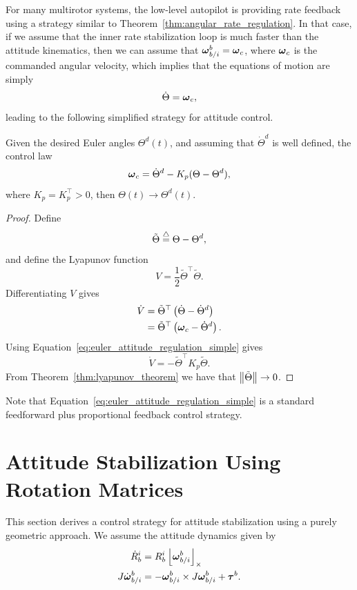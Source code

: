 For many multirotor systems, the low-level autopilot is providing rate feedback using a strategy similar to Theorem~\ref{thm:angular_rate_regulation}.  In that case, if we assume that the inner rate stabilization loop is much faster than the attitude kinematics, then we can assume that $\boldsymbol{\omega}_{b/i}^b = \boldsymbol{\omega}_c$, where $\boldsymbol{\omega}_c$ is the commanded angular velocity, which implies that the equations of motion are simply
\[
\dot{\Theta} = \boldsymbol{\omega}_c,
\]
leading to the following simplified strategy for attitude control.
\begin{theorem}\label{thm:euler_attitude_stabilization_simple}
	Given the desired Euler angles $\Theta^d(t)$, and assuming that $\dot{\Theta}^d$ is well defined, the control law
	\begin{equation}\label{eq:euler_attitude_regulation_simple}
	\omegabf_c = \dot{\Theta}^d - K_p (\Theta-\Theta^d),
	\end{equation}
	where $K_p=K_p^\top >0$, then $\Theta(t)\to\Theta^d(t)$.
\end{theorem}
\begin{proof}
Define
\[
\tilde{\Theta} \stackrel{\triangle}{=} \Theta - \Theta^d,
\]
and define the Lyapunov function
\[
V = \frac{1}{2}\tilde{\Theta}^\top \tilde{\Theta}.
\]
Differentiating $V$ gives
\begin{align*}
\dot{V} &= \tilde{\Theta}^\top \left(\dot{\Theta} - \dot{\Theta}^d\right) \\
	&= \tilde{\Theta}^\top \left(\boldsymbol{\omega}_c - \dot{\Theta}^d\right).
\end{align*}
Using Equation~\eqref{eq:euler_attitude_regulation_simple} gives
\[
\dot{V} = -\tilde{\Theta}^\top K_p \tilde{\Theta}.
\]
From Theorem~\ref{thm:lyapunov_theorem} we have that $\left\|\tilde{\Theta}\right\|\to 0$.
\end{proof}

Note that Equation~\eqref{eq:euler_attitude_regulation_simple} is a standard feedforward plus proportional feedback control strategy.

\section{Attitude Stabilization Using Rotation Matrices}

This section derives a control strategy for attitude stabilization using a purely geometric approach. We assume the attitude dynamics given by
\begin{align}
\dot{R}_b^i &= R_b^i\left\lfloor\boldsymbol{\omega}_{b/i}^b\right\rfloor_{\times} \\
J\dot{\boldsymbol{\omega}}_{b/i}^b &= -\boldsymbol{\omega}_{b/i}^b \times J\boldsymbol{\omega}_{b/i}^b + \boldsymbol{\tau}^b.
\end{align}

